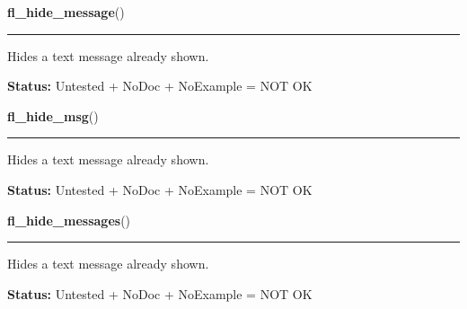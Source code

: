     \label{xformslib:library:fl_hide_message}

    \vspace{0.5ex}

\hspace{.8\funcindent}\begin{boxedminipage}{\funcwidth}

    \raggedright \textbf{fl\_hide\_message}()

    \vspace{-1.5ex}

    \rule{\textwidth}{0.5\fboxrule}
\setlength{\parskip}{2ex}
    Hides a text message already shown.

\setlength{\parskip}{1ex}
\textbf{Status:} Untested + NoDoc + NoExample = NOT OK



    \end{boxedminipage}

    \label{xformslib:library:fl_hide_message}

    \vspace{0.5ex}

\hspace{.8\funcindent}\begin{boxedminipage}{\funcwidth}

    \raggedright \textbf{fl\_hide\_msg}()

    \vspace{-1.5ex}

    \rule{\textwidth}{0.5\fboxrule}
\setlength{\parskip}{2ex}
    Hides a text message already shown.

\setlength{\parskip}{1ex}
\textbf{Status:} Untested + NoDoc + NoExample = NOT OK



    \end{boxedminipage}

    \label{xformslib:library:fl_hide_message}

    \vspace{0.5ex}

\hspace{.8\funcindent}\begin{boxedminipage}{\funcwidth}

    \raggedright \textbf{fl\_hide\_messages}()

    \vspace{-1.5ex}

    \rule{\textwidth}{0.5\fboxrule}
\setlength{\parskip}{2ex}
    Hides a text message already shown.

\setlength{\parskip}{1ex}
\textbf{Status:} Untested + NoDoc + NoExample = NOT OK



    \end{boxedminipage}

